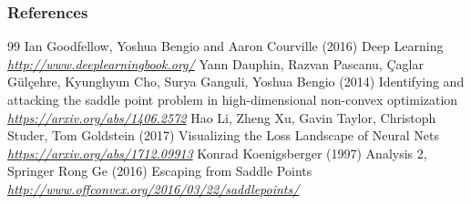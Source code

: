 \begin{vbframe}
\frametitle{References}
\footnotesize{
\begin{thebibliography}{99}
 Ian Goodfellow, Yoshua Bengio and Aaron Courville (2016)
\newblock Deep Learning
\newblock \emph{\url{http://www.deeplearningbook.org/}}
 Yann Dauphin, Razvan Pascanu, {\c{C}}aglar G{\"{u}}l{\c{c}}ehre, Kyunghyun Cho, Surya Ganguli, Yoshua Bengio (2014)
\newblock Identifying and attacking the saddle point problem in high-dimensional non-convex optimization
\newblock \emph{\url{https://arxiv.org/abs/1406.2572}}
 Hao Li, Zheng Xu, Gavin Taylor, Christoph Studer, Tom Goldstein (2017)
\newblock Visualizing the Loss Landscape of Neural Nets
\newblock \emph{\url{https://arxiv.org/abs/1712.09913}}
 Konrad Koenigsberger (1997)
\newblock Analysis 2, Springer
 Rong Ge (2016)
\newblock Escaping from Saddle Points
\newblock \emph{\url{http://www.offconvex.org/2016/03/22/saddlepoints/}}

\end{thebibliography}
}
\end{vbframe}

\endlecture

